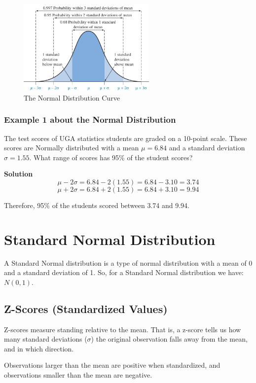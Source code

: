 \begin{figure}[h!]
\centering
\includegraphics[width=0.6\textwidth]{figures/normal_density.jpg}
\caption{The Normal Distribution Curve}
\label{fig:normal_density.jpg}
\end{figure}

\subsubsection*{Example 1 about the Normal Distribution}
The test scores of UGA statistics students are graded on a 10-point scale. These scores are Normally distributed with a mean $\mu = 6.84$ and a standard deviation $\sigma = 1.55$. What range of scores has 95\% of the student scores?

\textbf{Solution}
\[
\mu - 2\sigma = 6.84 - 2(1.55) = 6.84 - 3.10 = 3.74
\]
\[
\mu + 2\sigma = 6.84 + 2(1.55) = 6.84 + 3.10 = 9.94
\]

Therefore, 95\% of the students scored between 3.74 and 9.94.

\section{Standard Normal Distribution}
A Standard Normal distribution is a type of normal distribution with a mean of 0 and a standard deviation of 1. So, for a Standard Normal distribution we have: \(N(0,1).\)

\subsection{Z-Scores (Standardized Values)}
Z-scores measure standing relative to the mean. That is, a z-score tells us how many standard deviations ($\sigma$) the original observation falls away from the mean, and in which direction.

Observations larger than the mean are positive when standardized, and observations smaller than the mean are negative.

